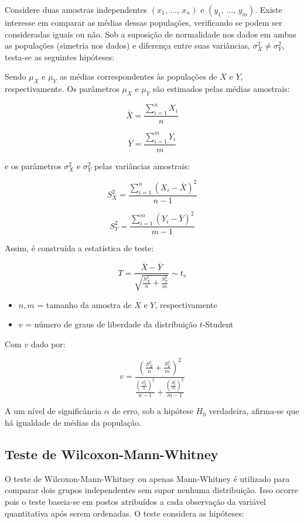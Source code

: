\documentclass[
]{estat/estat}
\providecommand{\tightlist}{%
  \setlength{\itemsep}{0pt}\setlength{\parskip}{0pt}}\usepackage{longtable,booktabs,array}
\begin{document}
Considere duas amostras independentes \((x_1,\, \ldots , \, x_n)\) e
\((y_1,\, \ldots , \, y_m)\). Existe interesse em comparar as médias
dessas populações, verificando se podem ser consideradas iguais ou não.
Sob a suposição de normalidade nos dados em ambas as populações
(simetria nos dados) e diferença entre suas variâncias,
\(\sigma_X^2 \neq \sigma_Y^2\), testa-se as seguintes hipóteses:


Sendo \(\mu_X\) e \(\mu_Y\) as médias correspondentes às populações de
\(X\) e \(Y\), respectivamente. Os parâmetros \(\mu_X\) e \(\mu_Y\) são
estimados pelas médias amostrais:

\[
\bar{X} = \frac{\sum_{i=1}^{n} X_i}{n}
\]

\[
\bar{Y} = \frac{\sum_{i=1}^{m} Y_i}{m}
\]

e os parâmetros \(\sigma_X^2\) e \(\sigma_Y^2\) pelas variâncias
amostrais:

\[
S_X^2 = \frac{\sum_{i=1}^{n}(X_i - \bar{X})^2}{n - 1}
\]

\[
S_Y^2 = \frac{\sum_{i=1}^{m}(Y_i - \bar{Y})^2}{m - 1}
\]

Assim, é construída a estatística de teste:

\[
T = \frac{\bar{X} - \bar{Y}}{\sqrt{\frac{S_X^2}{n} + \frac{S_Y^2}{m}}} \sim t_v
\]

\begin{itemize}
\tightlist
\item
  \(n, m\) = tamanho da amostra de \(X\) e \(Y\), respectivamente
\item
  \(v\) = número de graus de liberdade da distribuição \(t\)-Student
\end{itemize}

Com \(v\) dado por:

\[
v = \frac{\left(\frac{S_X^2}{n} + \frac{S_Y^2}{m}\right)^2}{\frac{\left(\frac{S_X^2}{n}\right)^2}{n - 1} + \frac{\left(\frac{S_Y^2}{m}\right)^2}{m - 1}}
\]

A um nível de significância \(\alpha\) de erro, sob a hipótese \(H_{0}\)
verdadeira, afirma-se que há igualdade de médias da população.

\subsection{Teste de
Wilcoxon-Mann-Whitney}\label{teste-de-wilcoxon-mann-whitney}

O teste de Wilcoxon-Mann-Whitney ou apenas Mann-Whitney é utilizado para comparar dois grupos independentes sem supor nenhuma distribuição. Isso ocorre pois o teste baseia-se em postos atribuídos a cada observação da variável quantitativa após serem ordenadas. O teste considera as hipóteses:
\end{document}
